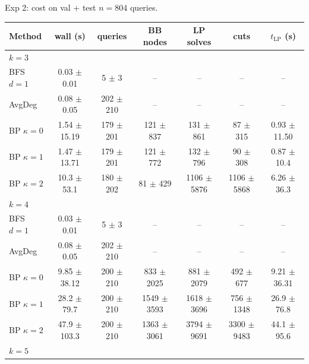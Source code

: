 \documentclass{beamer}
\begin{document}
\begin{frame}{Exp 2: cost on val + test}
  $n = 804$ queries.
  \vfill

  \tiny
  \begin{center}
  \begin{tabular}{lcccccc}
    \toprule
    Method & wall (s) & queries & BB nodes & LP solves & cuts & $t_{\text{LP}}$ (s) \\
    \midrule
    \multicolumn{7}{l}{\textit{$k = 3$}} \\
    BFS $d{=}1$              & 0.03 $\pm$ 0.01  & 5 $\pm$ 3     & --                 & --                  & --                  & --              \\
    AvgDeg                   & 0.08 $\pm$ 0.05  & 202 $\pm$ 210 & --                 & --                  & --                  & --              \\
    BP $\kappa{=}0$          & 1.54 $\pm$ 15.19 & 179 $\pm$ 201 & 121 $\pm$ 837      & 131 $\pm$ 861       & 87 $\pm$ 315        & 0.93 $\pm$ 11.50 \\
    BP $\kappa{=}1$          & 1.47 $\pm$ 13.71 & 179 $\pm$ 201 & 121 $\pm$ 772      & 132 $\pm$ 796       & 90 $\pm$ 308        & 0.87 $\pm$ 10.4 \\
    BP $\kappa{=}2$          & 10.3 $\pm$ 53.1  & 180 $\pm$ 202 & 81 $\pm$ 429       & 1106 $\pm$ 5876     & 1106 $\pm$ 5868     & 6.26 $\pm$ 36.3 \\
    \midrule
    \multicolumn{7}{l}{\textit{$k = 4$}} \\
    BFS $d{=}1$              & 0.03 $\pm$ 0.01  & 5 $\pm$ 3     & --                 & --                  & --                  & --              \\
    AvgDeg                   & 0.08 $\pm$ 0.05  & 202 $\pm$ 210 & --                 & --                  & --                  & --              \\
    BP $\kappa{=}0$          & 9.85 $\pm$ 38.12 & 200 $\pm$ 210 & 833 $\pm$ 2025     & 881 $\pm$ 2079      & 492 $\pm$ 677       & 9.21 $\pm$ 36.31 \\
    BP $\kappa{=}1$          & 28.2 $\pm$ 79.7  & 200 $\pm$ 210 & 1549 $\pm$ 3593    & 1618 $\pm$ 3696     & 756 $\pm$ 1348      & 26.9 $\pm$ 76.8 \\
    BP $\kappa{=}2$          & 47.9 $\pm$ 103.3 & 200 $\pm$ 210 & 1363 $\pm$ 3061    & 3794 $\pm$ 9691     & 3300 $\pm$ 9483     & 44.1 $\pm$ 95.6 \\
    \midrule
    \multicolumn{7}{l}{\textit{$k = 5$}} \\

\end{tabular}
\end{center}
\end{frame}
\end{document}

